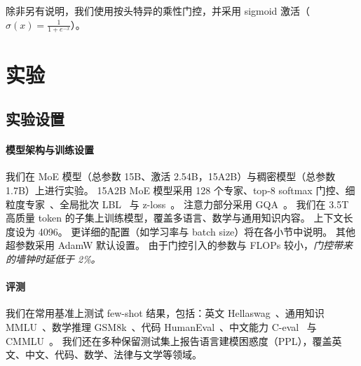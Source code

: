 \documentclass{article} %
\begin{document}
除非另有说明，我们使用按头特异的乘性门控，并采用 sigmoid 激活（$ \sigma(x) = \frac{1}{1 + e^{-x}} $）。


\section{实验}



\subsection{实验设置}

\paragraph{模型架构与训练设置} 
我们在 MoE 模型（总参数 15B、激活 2.54B，15A2B）与稠密模型（总参数 1.7B）上进行实验。
15A2B MoE 模型采用 128 个专家、top-8 softmax 门控、细粒度专家~\citep{dai2024deepseekmoe}、全局批次 LBL~\citep{global_balance} 与 z-loss~\citep{zoph2022st}。
注意力部分采用 GQA~\citep{ainslie2023gqa}。
我们在 3.5T 高质量 token 的子集上训练模型，覆盖多语言、数学与通用知识内容。
上下文长度设为 4096。
更详细的配置（如学习率与 batch size）将在各小节中说明。
其他超参数采用 AdamW 默认设置。
由于门控引入的参数与 FLOPs 较小，\textit{门控带来的墙钟时延低于 2\%。}

\paragraph{评测} 我们在常用基准上测试 few-shot 结果，包括：英文 Hellaswag~\citep{zellers2019hellaswag}、通用知识 MMLU~\citep{hendrycks2020measuring}、数学推理 GSM8k~\citep{cobbe2021training}、代码 HumanEval~\citep{chen2021codex}、中文能力 C-eval~\citep{huang2024c} 与 CMMLU~\citep{li2023cmmlu}。
我们还在多种保留测试集上报告语言建模困惑度（PPL），覆盖英文、中文、代码、数学、法律与文学等领域。
\end{document}
